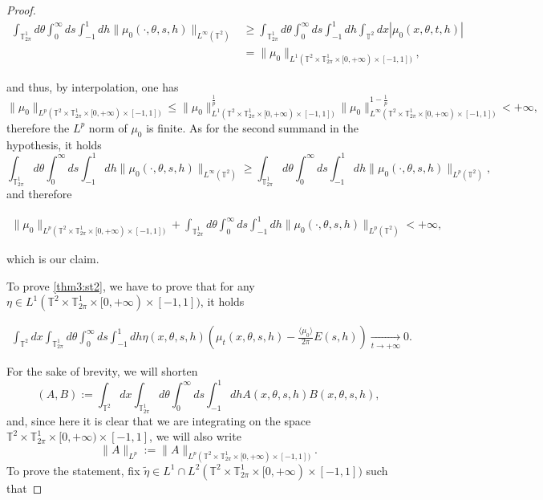 \documentclass[a4paper,10pt,reqno]{amsart}
\numberwithin{equation}{subsection}
\numberwithin{figure}{subsection}
\begin{document}
\begin{proof}
{\small\begin{align*}
\int_{\mathbb{T}^1_{2\pi}}d\theta\int_0^{\infty}ds\int_{-1}^1dh\|\mu_0(\cdot,\theta,s,h)\|_{L^{\infty}(\mathbb{T}^2)}&\geq\int_{\mathbb{T}^1_{2\pi}}d\theta\int_0^{\infty}ds\int_{-1}^1dh\int_{\mathbb{T}^2}dx|\mu_0(x,\theta,t,h)|
\\
&=\|\mu_0\|_{L^1(\mathbb{T}^2\times\mathbb{T}^1_{2\pi}\times[0,+\infty)\times[-1,1])},
\end{align*}}

and thus, by interpolation, one has
{\tiny\[
\|\mu_0\|_{L^p(\mathbb{T}^2\times\mathbb{T}^1_{2\pi}\times[0,+\infty)\times[-1,1])}\leq\|\mu_0\|_{L^1(\mathbb{T}^2\times\mathbb{T}^1_{2\pi}\times[0,+\infty)\times[-1,1])}^{\frac{1}{p}}\|\mu_0\|_{L^{\infty}(\mathbb{T}^2\times\mathbb{T}^1_{2\pi}\times[0,+\infty)\times[-1,1])}^{1-\frac{1}{p}}<+\infty,
\]}
therefore the $L^p$ norm of $\mu_0$ is finite. As for the second summand in the hypothesis, it holds
{\small\[
\int_{\mathbb{T}^1_{2\pi}}d\theta\int_0^{\infty}ds\int_{-1}^1dh\|\mu_0(\cdot,\theta,s,h)\|_{L^{\infty}(\mathbb{T}^2)}\geq\int_{\mathbb{T}^1_{2\pi}}d\theta\int_0^{\infty}ds\int_{-1}^1dh\|\mu_0(\cdot,\theta,s,h)\|_{L^p(\mathbb{T}^2)},
\]}
and therefore

\begin{align}\label{ognip}
\|\mu_0\|_{L^p(\mathbb{T}^2\times\mathbb{T}^1_{2\pi}\times[0,+\infty)\times[-1,1])}+\int_{\mathbb{T}^1_{2\pi}}d\theta\int_0^{\infty}ds\int_{-1}^1dh\|\mu_0(\cdot,\theta,s,h)\|_{L^p(\mathbb{T}^2)}<+\infty,
\end{align}

which is our claim.

To prove \eqref{thm3:st2}, we have to prove that for any $\eta\in L^1(\mathbb{T}^2\times\mathbb{T}^1_{2\pi}\times[0,+\infty)\times[-1,1])$, it holds

\begin{align*}
\int_{\mathbb{T}^2}dx\int_{\mathbb{T}^1_{2\pi}}d\theta\int_0^{\infty}ds\int_{-1}^1dh\eta(x,\theta,s,h)\left(\mu_t(x,\theta,s,h)-\frac{\langle\mu_0\rangle}{2\pi}E(s,h)\right)\xrightarrow[t\to+\infty]{}0.
\end{align*}

For the sake of brevity, we will shorten
\[
( A,B):=\int_{\mathbb{T}^2}dx\int_{\mathbb{T}^1_{2\pi}}d\theta\int_0^{\infty}ds\int_{-1}^1dhA(x,\theta,s,h)B(x,\theta,s,h),
\]
and, since here it is clear that we are integrating on the space $\mathbb{T}^2\times\mathbb{T}^1_{2\pi}\times[0,+\infty)\times[-1,1]$, we will also write
\[
\|A\|_{L^p}:=\|A\|_{L^p(\mathbb{T}^2\times\mathbb{T}^1_{2\pi}\times[0,+\infty)\times[-1,1])}.
\]
To prove the statement, fix $\tilde\eta\in L^1\cap L^2(\mathbb{T}^2\times\mathbb{T}^1_{2\pi}\times[0,+\infty)\times[-1,1])$ such that


\end{proof}
\end{document}
